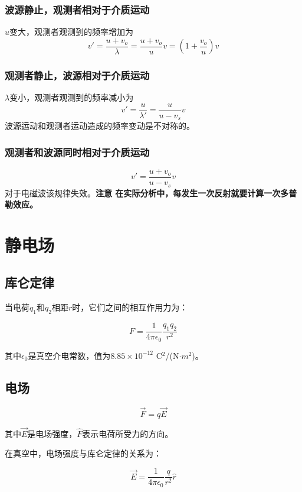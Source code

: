 \subsubsection{波源静止，观测者相对于介质运动}
$ u $变大，观测者观测到的频率增加为
\begin{equation}\label{key}
	v'=\dfrac{u+v_o}{\lambda}=\dfrac{u+v_o}{u}v=(1+\dfrac{v_o}{u})v
\end{equation}
\subsubsection{观测者静止，波源相对于介质运动}
$ \lambda $变小，观测者观测到的频率减小为
\begin{equation}\label{key}
	v'=\dfrac{u}{\lambda'}=\dfrac{u}{u-v_s}v
\end{equation}
波源运动和观测者运动造成的频率变动是不对称的。
\subsubsection{观测者和波源同时相对于介质运动}
\begin{equation}\label{key}
	v'=\dfrac{u+v_o}{u-v_s}v
\end{equation}
对于电磁波该规律失效。\textbf{注意 在实际分析中，每发生一次反射就要计算一次多普勒效应。}

\section{静电场}

\subsection{库仑定律}

当电荷$q_1$和$q_2$相距$r$时，它们之间的相互作用力为：

$$ F = \frac{1}{4\pi\epsilon_0}\frac{q_1q_2}{r^2} $$

其中$\epsilon_0$是真空介电常数，值为$8.85\times 10^{-12}$ C$^2$/(N$\cdot m^2$)。
\subsection{电场}

$$ \vec{F} = q\vec{E} $$

其中$\vec{E}$是电场强度，$\hat{F}$表示电荷所受力的方向。

在真空中，电场强度与库仑定律的关系为：

$$ \vec{E} = \frac{1}{4\pi\epsilon_0}\frac{q}{r^2}\hat{r} $$

